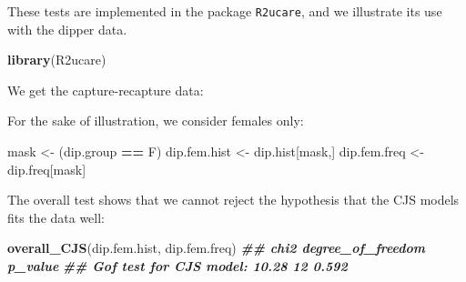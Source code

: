 \documentclass[
  12pt,
]{krantz}
\newenvironment{Shaded}{\begin{snugshade}}{\end{snugshade}}
\newcommand{\CommentTok}[1]{\textcolor[rgb]{0.56,0.35,0.01}{\textit{#1}}}
\newcommand{\DecValTok}[1]{\textcolor[rgb]{0.00,0.00,0.81}{#1}}
\newcommand{\DocumentationTok}[1]{\textcolor[rgb]{0.56,0.35,0.01}{\textbf{\textit{#1}}}}
\newcommand{\FunctionTok}[1]{\textcolor[rgb]{0.13,0.29,0.53}{\textbf{#1}}}
\newcommand{\NormalTok}[1]{#1}
\newcommand{\OtherTok}[1]{\textcolor[rgb]{0.56,0.35,0.01}{#1}}
\newcommand{\SpecialCharTok}[1]{\textcolor[rgb]{0.81,0.36,0.00}{\textbf{#1}}}
\newcommand{\StringTok}[1]{\textcolor[rgb]{0.31,0.60,0.02}{#1}}
\begin{document}
These tests are implemented in the package \texttt{R2ucare}, and we illustrate its use with the dipper data.

\begin{Shaded}
\begin{Highlighting}[]
\FunctionTok{library}\NormalTok{(R2ucare)}
\end{Highlighting}
\end{Shaded}

We get the capture-recapture data:

\begin{Shaded}
\end{Shaded}

For the sake of illustration, we consider females only:

\begin{Shaded}
\begin{Highlighting}[]
\NormalTok{mask }\OtherTok{\textless{}{-}}\NormalTok{ (dip.group }\SpecialCharTok{==} \StringTok{\textquotesingle{}F\textquotesingle{}}\NormalTok{)}
\NormalTok{dip.fem.hist }\OtherTok{\textless{}{-}}\NormalTok{ dip.hist[mask,]}
\NormalTok{dip.fem.freq }\OtherTok{\textless{}{-}}\NormalTok{ dip.freq[mask]}
\end{Highlighting}
\end{Shaded}

The overall test shows that we cannot reject the hypothesis that the CJS models fits the data well:

\begin{Shaded}
\begin{Highlighting}[]
\FunctionTok{overall\_CJS}\NormalTok{(dip.fem.hist, dip.fem.freq)}
\DocumentationTok{\#\#                          chi2 degree\_of\_freedom p\_value}
\DocumentationTok{\#\# Gof test for CJS model: 10.28                12   0.592}
\end{Highlighting}
\end{Shaded}
\end{document}
